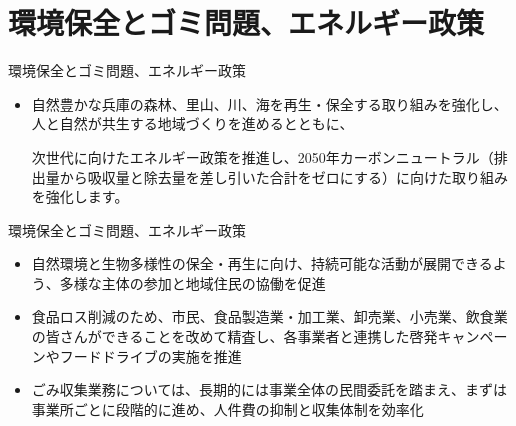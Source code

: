 \documentclass[dvipdfmx]{beamer}
\begin{document}
\section{環境保全とゴミ問題、エネルギー政策}
    \begin{frame}{}{}
        \sectionpage
    \end{frame}

    \begin{frame}{環境保全とゴミ問題、エネルギー政策}{}
        \begin{small}
            \begin{itemize}
                \setlength{\parsep}{.5mm}
                \setlength{\itemsep}{2mm}
                \item 自然豊かな兵庫の森林、里山、川、海を再生・保全する取り組みを強化し、人と自然が共生する地域づくりを進めるとともに、\par
                次世代に向けたエネルギー政策を推進し、2050年カーボンニュートラル（排出量から吸収量と除去量を差し引いた合計をゼロにする）に向けた取り組みを強化します。
            \end{itemize}
        \end{small}
    \end{frame}

    \begin{frame}{環境保全とゴミ問題、エネルギー政策}{}
        \begin{small}
            \begin{itemize}
                \setlength{\parsep}{.5mm}
                \setlength{\itemsep}{2mm}
                \item 自然環境と生物多様性の保全・再生に向け、持続可能な活動が展開できるよう、多様な主体の参加と地域住民の協働を促進
                \item 食品ロス削減のため、市民、食品製造業・加工業、卸売業、小売業、飲食業の皆さんができることを改めて精査し、各事業者と連携した啓発キャンペーンやフードドライブの実施を推進
                \item ごみ収集業務については、長期的には事業全体の民間委託を踏まえ、まずは事業所ごとに段階的に進め、人件費の抑制と収集体制を効率化
            \end{itemize}
        \end{small}
    \end{frame}
\end{document}

